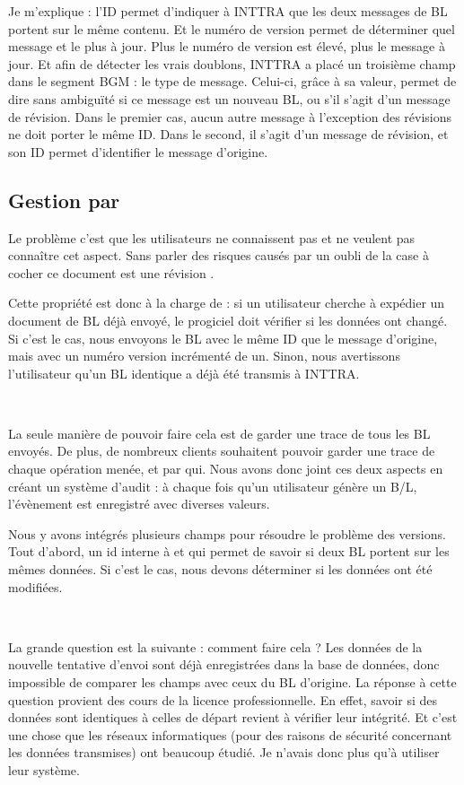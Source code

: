 Je m'explique : l'ID permet d'indiquer à INTTRA que les deux messages de BL portent sur le même contenu. Et le numéro de version permet de déterminer quel message et le plus à jour. Plus le numéro de version est élevé, plus le message à jour. Et afin de détecter les vrais doublons, INTTRA a placé un troisième champ dans le segment BGM : le type de message. Celui-ci, grâce à sa valeur, permet de dire sans ambiguïté si ce message est un nouveau BL, ou s'il s'agit d'un message de révision. Dans le premier cas, aucun autre message à l'exception des révisions ne doit porter le même ID. Dans le second, il s'agit d'un message de révision, et son ID permet d'identifier le message d'origine.


\subsection{Gestion par \integrale}
Le problème c'est que les utilisateurs ne connaissent pas et ne veulent pas connaître cet aspect. Sans parler des risques causés par un oubli de la case à cocher \og ce document est une révision \fg.

Cette propriété est donc à la charge de \integrale{} : si un utilisateur cherche à expédier un document de BL déjà envoyé, le progiciel doit vérifier si les données ont changé. Si c'est le cas, nous envoyons le BL avec le même ID que le message d'origine, mais avec un numéro version incrémenté de un. Sinon, nous avertissons l'utilisateur qu'un BL identique a déjà été transmis à INTTRA.

~

La seule manière de pouvoir faire cela est de garder une trace de tous les BL envoyés. De plus, de nombreux clients souhaitent pouvoir garder une trace de chaque opération menée, et par qui. Nous avons donc joint ces deux aspects en créant un système d'audit : à chaque fois qu'un utilisateur génère un B/L, l'évènement est enregistré avec diverses valeurs.

Nous y avons intégrés plusieurs champs pour résoudre le problème des versions. Tout d'abord, un id interne à \solulog{} et qui permet de savoir si deux BL portent sur les mêmes données. Si c'est le cas, nous devons déterminer si les données ont été modifiées.

~

La grande question est la suivante : comment faire cela ? Les données de la nouvelle tentative d'envoi sont déjà enregistrées dans la base de données, donc impossible de comparer les champs avec ceux du BL d'origine. La réponse à cette question provient des cours de la licence professionnelle. En effet, savoir si des données sont identiques à celles de départ revient à vérifier leur intégrité. Et c'est une chose que les réseaux informatiques (pour des raisons de sécurité concernant les données transmises) ont beaucoup étudié. Je n'avais donc plus qu'à utiliser leur système.

